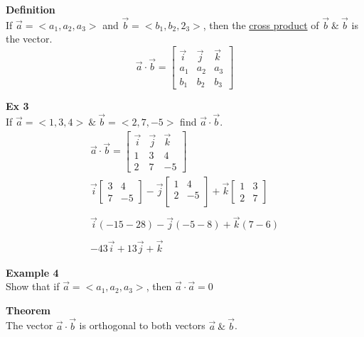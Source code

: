 \documentclass{article}
\begin{document}
  \textbf{Definition}\\
  If $ \vec{ a }  = < a_1, a_2, a_3> $ and $ \vec{ b } = < b_1, b_2, 2_3>   $, then the \underline{cross product} of $ \vec{ b } ~\&~ \vec{ b }   $ is the vector.
  \[
    \vec{a} \cdot \vec{ b } =
    \begin{bmatrix}
      \vec{ i } & \vec{ j } & \vec{ k }\\
      a_1 &a_2 &a_3\\
      b_1 &b_2 &b_3
    \end{bmatrix}
  \]
  
  \textbf{Ex 3}\\
  If $ \vec{ a } = < 1, 3, 4>   ~ \&~ \vec{ b } = < 2, 7, -5>  $ find $ \vec{ a } \cdot \vec{b }   $.
  \[
    \begin{gathered}
    \vec{ a } \cdot \vec{ b } =
    \begin{bmatrix}
      \vec{ i } & \vec{ j } & \vec{ k }  \\
      1 &3 &4\\
      2 &7 &-5
    \end{bmatrix}\\
    \vec{ i } 
    \begin{bmatrix}
      3 & 4\\
      7 &-5
    \end{bmatrix} -
    \vec{j} \begin{bmatrix}
      1 &4 \\
      2 &-5\\
    \end{bmatrix} +
    \vec{k} \begin{bmatrix}
      1 & 3\\
      2 & 7
    \end{bmatrix}\\
    ~\\
    \vec{i} (-15-28) - \vec{j}(-5-8) + \vec{k}(7-6)\\
    ~\\
    \boxed{-43\vec{i} + 13\vec{j} + \vec{k}} 
    \end{gathered}
  \]

  \textbf{Example 4}\\
  Show that if $ \vec{a} = <a_1, a_2, a_3> $, then $ \vec{a} \cdot \vec{a} =0 $

  \textbf{Theorem}\\
  The vector $ \vec{ a } \cdot \vec{ b }   $ is orthogonal to both vectors $ \vec{ a } ~ \&~ \vec{ b }   $. 
\end{document}
